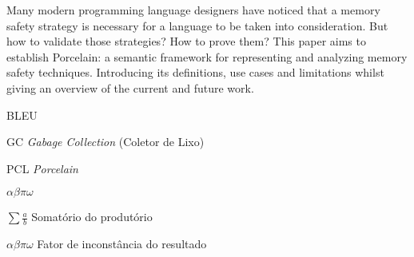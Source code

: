 \documentclass[cic,tc]{iiufrgs}
\begin{document}
\begin{translatedabstract}
Many modern programming language designers have noticed that a memory safety strategy is necessary for a language to be taken into consideration. But how to validate
those strategies? How to prove them? This paper aims to establish Porcelain: a
semantic framework for representing and analyzing memory safety techniques. Introducing its definitions, use cases
and limitations whilst giving an overview of the current and
future work.
\end{translatedabstract}

\listoffigures

\listoftables

\begin{listofabbrv}{BLEU}
    \item[GC] \emph{Gabage Collection} (Coletor de Lixo)
    \item[PCL] \emph{Porcelain}
\end{listofabbrv}

\begin{listofsymbols}{$\alpha\beta\pi\omega$}
    \item[$\sum{\frac{a}{b}}$] Somatório do produtório
    \item[$\alpha\beta\pi\omega$] Fator de inconstância do resultado
\end{listofsymbols}

\tableofcontents







%



%



\end{document}
